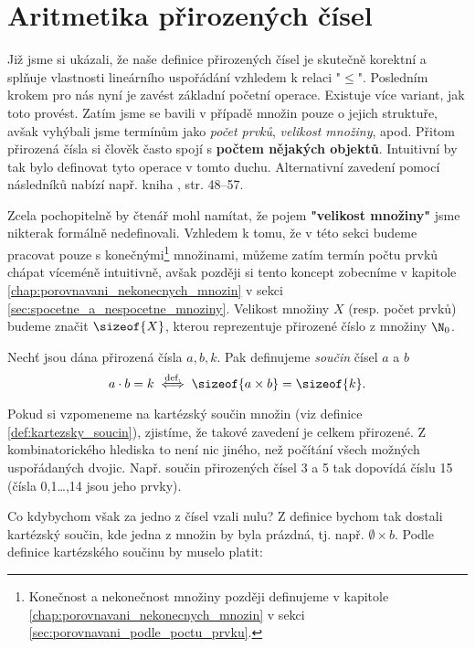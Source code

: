 \section{Aritmetika přirozených čísel}\label{sec:aritmetika_prirozenych_cisel}
Již jsme si ukázali, že naše definice přirozených čísel je skutečně korektní a splňuje vlastnosti lineárního uspořádání vzhledem k relaci "$\leq$". Posledním krokem pro nás nyní je zavést základní početní operace. Existuje více variant, jak toto provést. Zatím jsme se bavili v případě množin pouze o jejich struktuře, avšak vyhýbali jsme termínům jako \emph{počet prvků}, \emph{velikost množiny}, apod. Přitom přirozená čísla si člověk často spojí s \textbf{počtem nějakých objektů}. Intuitivní by tak bylo definovat tyto operace v tomto duchu. Alternativní zavedení pomocí následníků nabízí např. kniha \cite{Goldrei2017}, str. 48--57.\par
Zcela pochopitelně by čtenář mohl namítat, že pojem \textbf{"velikost množiny"} jsme nikterak formálně nedefinovali. Vzhledem k tomu, že v této sekci budeme pracovat pouze s konečnými\footnote{Konečnost a nekonečnost množiny později definujeme v kapitole \ref{chap:porovnavani_nekonecnych_mnozin} v sekci \ref{sec:porovnavani_podle_poctu_prvku}.} množinami, můžeme zatím termín počtu prvků chápat víceméně intuitivně, avšak později si tento koncept zobecníme v kapitole \ref{chap:porovnavani_nekonecnych_mnozin} v sekci \ref{sec:spocetne_a_nespocetne_mnoziny}. Velikost množiny $X$ (resp. počet prvků) budeme značit $\sizeof{X}$, kterou reprezentuje přirozené číslo z množiny $\N_0$.\par
\begin{definition}\label{def:soucin_pritozenych_cisel}
    Nechť jsou dána přirozená čísla $a,b,k$. Pak definujeme \emph{součin} čísel $a$ a $b$
    \begin{equation*}
        a\cdot b=k\stackrel{\text{def.}}{\iff} \sizeof{a\times b}=\sizeof{k}.
    \end{equation*}
\end{definition}
Pokud si vzpomeneme na kartézský součin množin (viz definice \ref{def:kartezsky_soucin}), zjistíme, že takové zavedení je celkem přirozené. Z kombinatorického hlediska to není nic jiného, než počítání všech možných uspořádaných dvojic. Např. součin přirozených čísel 3 a 5 tak dopovídá číslu 15 (čísla 0,1\dots,14 jsou jeho prvky).\par
Co kdybychom však za jedno z čísel vzali nulu? Z definice bychom tak dostali kartézský součin, kde jedna z množin by byla prázdná, tj. např. $\emptyset\times b$. Podle definice kartézského součinu by muselo platit:
